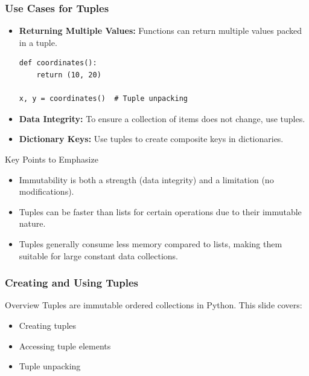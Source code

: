 \documentclass{beamer}
\begin{document}
\begin{frame}[fragile]
    \frametitle{Use Cases for Tuples}
    \begin{itemize}
        \item \textbf{Returning Multiple Values:} Functions can return multiple values packed in a tuple.
        \begin{lstlisting}
def coordinates():
    return (10, 20)

x, y = coordinates()  # Tuple unpacking
        \end{lstlisting}
        
        \item \textbf{Data Integrity:} To ensure a collection of items does not change, use tuples.
        
        \item \textbf{Dictionary Keys:} Use tuples to create composite keys in dictionaries.
    \end{itemize}
    
    \begin{block}{Key Points to Emphasize}
        \begin{itemize}
            \item Immutability is both a strength (data integrity) and a limitation (no modifications).
            \item Tuples can be faster than lists for certain operations due to their immutable nature.
            \item Tuples generally consume less memory compared to lists, making them suitable for large constant data collections.
        \end{itemize}
    \end{block}
\end{frame}

\begin{frame}[fragile]
    \frametitle{Creating and Using Tuples}
    \begin{block}{Overview}
        Tuples are immutable ordered collections in Python. This slide covers:
        \begin{itemize}
            \item Creating tuples
            \item Accessing tuple elements
            \item Tuple unpacking
        \end{itemize}
    \end{block}
\end{frame}
\end{document}
